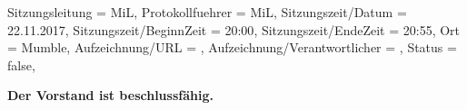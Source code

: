 \begin{Protokoll}{
        Sitzungsleitung                 = {MiL},             %
        Protokollfuehrer                = {MiL},              %
        Sitzungszeit/Datum              = {22.11.2017},       %
        Sitzungszeit/BeginnZeit         = {20:00},            %
        Sitzungszeit/EndeZeit           = {20:55},            %
        Ort                             = {Mumble},            %
        Aufzeichnung/URL                = {},                %
        Aufzeichnung/Verantwortlicher   = {},                  %
        Status                          = {false},            %
    }
    

    \begin{Anwesenheitsliste}
    \end{Anwesenheitsliste}
    
    \textbf{Der Vorstand ist beschlussfähig.}
    
    

\end{Protokoll}
